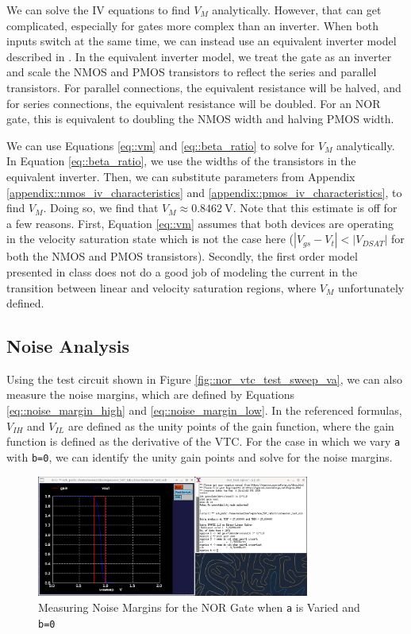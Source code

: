 \documentclass[fleqn]{article}
\begin{document}
	We can solve the IV equations to find $V_M$ analytically. However, that can get complicated, especially for gates more complex than an inverter. When both inputs switch at the same time, we can instead use an equivalent inverter model described in \cite{cmos_vlsi_design, equivalent_inverter, inverter_dc_analysis}. In the equivalent inverter model, we treat the gate as an inverter and scale the NMOS and PMOS transistors to reflect the series and parallel transistors. For parallel connections, the equivalent resistance will be halved, and for series connections, the equivalent resistance will be doubled. For an NOR gate, this is equivalent to doubling the NMOS width and halving PMOS width.
	
	\noindent We can use Equations \ref{eq::vm} and \ref{eq::beta_ratio} to solve for $V_M$ analytically. In Equation \ref{eq::beta_ratio}, we use the widths of the transistors in the equivalent inverter. Then, we can substitute parameters from Appendix \ref{appendix::nmos_iv_characteristics} and \ref{appendix::pmos_iv_characteristics}, to find $V_M$. Doing so, we find that $V_M \approx 0.8462\ \text{V}$. Note that this estimate is off for a few reasons. First, Equation \ref{eq::vm} assumes that both devices are operating in the velocity saturation state which is not the case here ($|V_{gs} - V_t| < |V_{DSAT}|$ for both the NMOS and PMOS transistors). Secondly, the first order model presented in class does not do a good job of modeling the current in the transition between linear and velocity saturation regions, where $V_M$ unfortunately defined.
	
	\subsection{Noise Analysis}
	
	Using the test circuit shown in Figure \ref{fig::nor_vtc_test_sweep_va}, we can also measure the noise margins, which are defined by Equations \ref{eq::noise_margin_high} and \ref{eq::noise_margin_low}. In the referenced formulas, $V_{IH}$ and $V_{IL}$ are defined as the unity points of the gain function, where the gain function is defined as the derivative of the VTC. For the case in which we vary \texttt{a} with \texttt{b=0}, we can identify the unity gain points and solve for the noise margins.
	
	\begin{figure}[H]
		\centerline{\includegraphics[width=0.8\textwidth]{nor_noise_analysis_sweep_va.png}}
		\caption{Measuring Noise Margins for the NOR Gate when \texttt{a} is Varied and \texttt{b=0}}	\label{fig::nor_noise_analysis_sweep_va}
	\end{figure}
	
\end{document}
